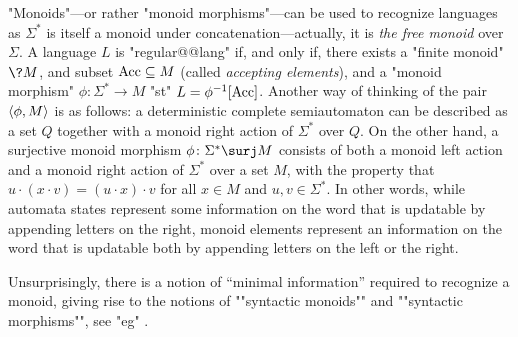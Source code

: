 "Monoids"---or rather "monoid morphisms"---can be used to recognize languages as $\Sigma^*$
is itself a monoid under concatenation---actually, it is \emph{the free monoid} over $\Sigma$.
A language $L$ is "regular@@lang" if, and only if, there exists a "finite monoid" $\?M$,
and subset $\textrm{Acc} \subseteq M$ (called \emph{accepting elements}), and a "monoid morphism"
$\phi\colon \Sigma^* \to M$ "st" $L = \phi^{-1}[\textrm{Acc}]$.
Another way of thinking of the pair $\langle\phi, M\rangle$ is as follows:
a deterministic complete semiautomaton can be described as a set $Q$ together
with a monoid right action of $\Sigma^*$ over $Q$. On the other hand,
a surjective monoid morphism $\phi\colon \Sigma^* \surj M$ consists of both a monoid
left action and a monoid right action of $\Sigma^*$ over a set $M$,
with the property that $u \cdot (x \cdot v) = (u \cdot x) \cdot v$ for all 
$x\in M$ and $u,v \in \Sigma^*$.
In other words, while automata states represent some information on the word
that is updatable by appending letters on the right, monoid elements represent
an information on the word that is updatable both by appending letters on the left or the right. 

Unsurprisingly, there is a notion of ``minimal information'' required to recognize a monoid,
giving rise to the notions of ""syntactic monoids"" and ""syntactic morphisms"",
see "eg" \cite[Theorem~1.7]{Bojanczyk2020MSO}.


